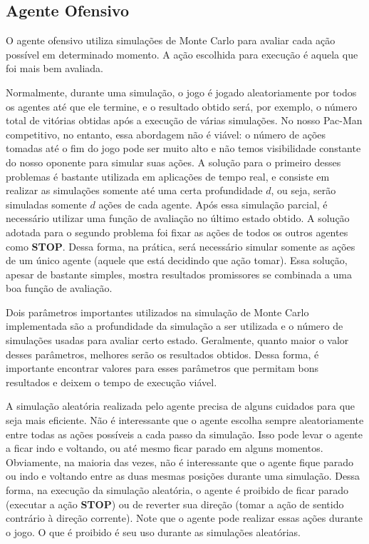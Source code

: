\documentclass[a4paper,12pt]{article}
\begin{document}
\subsection{Agente Ofensivo}
O agente ofensivo utiliza simulações de Monte Carlo para avaliar cada ação possível em
determinado momento. A ação escolhida para execução é aquela que foi mais bem avaliada.

Normalmente, durante uma simulação, o jogo é jogado aleatoriamente por todos os agentes
até que ele termine, e o resultado obtido será, por exemplo, o número total de vitórias obtidas
após a execução de várias simulações. No nosso Pac-Man competitivo, no entanto, essa
abordagem não é viável: o número de ações tomadas até o fim do jogo pode ser muito alto e
não temos visibilidade constante do nosso oponente para simular suas ações. A solução para
o primeiro desses problemas é bastante utilizada em aplicações de tempo real, e consiste
em realizar as simulações somente até uma certa profundidade $d$, ou seja, serão simuladas
somente $d$ ações de cada agente. Após essa simulação parcial, é necessário utilizar uma
função de avaliação no último estado obtido. A solução adotada para o segundo problema
foi fixar as ações de todos os outros agentes como \textbf{STOP}. Dessa forma, na prática,
será necessário simular somente as ações de um único agente (aquele que está decidindo que ação tomar).
Essa solução, apesar de bastante simples, mostra resultados promissores se combinada a
uma boa função de avaliação.

Dois parâmetros importantes utilizados na simulação de Monte Carlo implementada são a profundidade
da simulação a ser utilizada e o número de simulações usadas para avaliar certo estado.
Geralmente, quanto maior o valor desses parâmetros, melhores serão os resultados obtidos.
Dessa forma, é importante encontrar valores para esses parâmetros que permitam bons
resultados e deixem o tempo de execução viável.

A simulação aleatória realizada pelo agente precisa de alguns cuidados para que seja
mais eficiente. Não é interessante que o agente escolha sempre aleatoriamente entre todas
as ações possíveis a cada passo da simulação. Isso pode levar o agente a ficar indo e voltando,
ou até mesmo ficar parado em alguns momentos. Obviamente, na maioria das vezes, não é interessante
que o agente fique parado ou indo e voltando entre as duas mesmas posições durante uma simulação.
Dessa forma, na execução da simulação aleatória, o agente é proibido de ficar parado (executar
a ação \textbf{STOP}) ou de reverter sua direção (tomar a ação de sentido contrário à direção
corrente). Note que o agente pode realizar essas ações durante o jogo. O que é proibido é seu
uso durante as simulações aleatórias.
\end{document}
